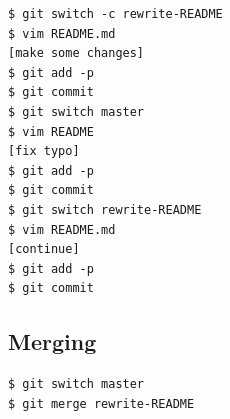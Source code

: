 \begin{frame}[fragile]
  \begin{example}
    \begin{lstlisting}
$ git switch -c rewrite-README
$ vim README.md
[make some changes]
$ git add -p
$ git commit
$ git switch master
$ vim README
[fix typo]
$ git add -p
$ git commit
$ git switch rewrite-README
$ vim README.md
[continue]
$ git add -p
$ git commit
    \end{lstlisting}
  \end{example}
\end{frame}

\subsection{Merging}

\begin{frame}[fragile]
  \begin{example}[Merging]
    \begin{lstlisting}
$ git switch master
$ git merge rewrite-README
    \end{lstlisting}
  \end{example}
\end{frame}

